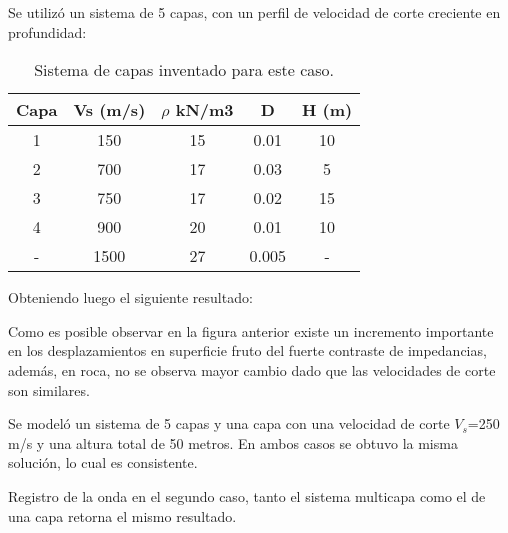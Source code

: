 
Se utilizó un sistema de 5 capas, con un perfil de velocidad de corte creciente en profundidad:

\begin{table}[H]
	\centering
	\caption{Sistema de capas inventado para este caso.}
	\begin{tabular}{ccccc}
		\hline
		\textbf{Capa} & \textbf{Vs (m/s)} & \boldmath{}\textbf{$\rho$ kN/m3}\unboldmath{} & \textbf{D} & \textbf{H (m)} \bigstrut\\
		\hline
		1     & 150   & 15    & 0.01  & 10 \bigstrut[t]\\
		2     & 700   & 17    & 0.03  & 5 \\
		3     & 750   & 17    & 0.02  & 15 \\
		4     & 900   & 20    & 0.01  & 10 \\
		-     & 1500  & 27    & 0.005 & - \bigstrut[b]\\
		\hline
	\end{tabular}
\end{table}

Obteniendo luego el siguiente resultado:


Como es posible observar en la figura anterior existe un incremento importante en los desplazamientos en superficie fruto del fuerte contraste de impedancias, además, en roca, no se observa mayor cambio dado que las velocidades de corte son similares.

\newpage
{}

Se modeló un sistema de 5 capas y una capa con una velocidad de corte $V_s$=250 m/s y una altura total de 50 metros. En ambos casos se obtuvo la misma solución, lo cual es consistente.

\begin{images}[\label{p2segundocaso}]{Registro de la onda en el segundo caso, tanto el sistema multicapa como el de una capa retorna el mismo resultado.}
\end{images}